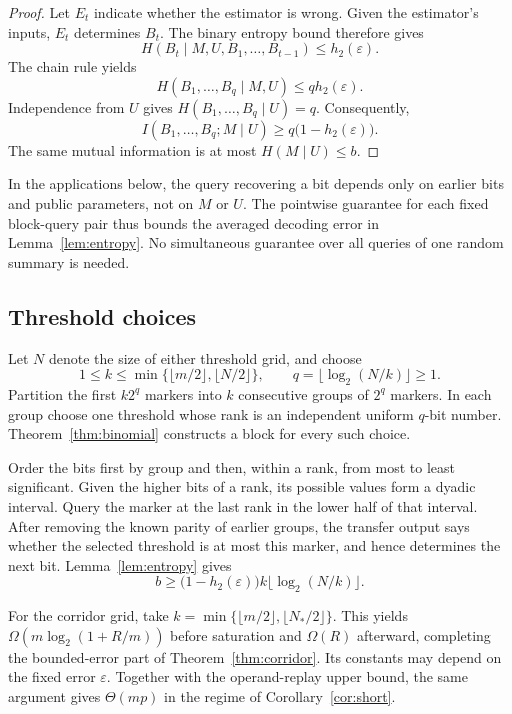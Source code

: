 \documentclass[11pt,reqno]{amsart}
\theoremstyle{definition}
\theoremstyle{remark}
\numberwithin{equation}{section}
\begin{document}
\begin{proof}
Let $E_t$ indicate whether the estimator is wrong. Given the
estimator's inputs, $E_t$ determines $B_t$. The binary entropy bound
therefore gives
\[
 H(B_t\mid M,U,B_1,\ldots,B_{t-1})\leq h_2(\varepsilon).
\]
The chain rule yields
\[
 H(B_1,\ldots,B_q\mid M,U)\leq qh_2(\varepsilon).
\]
Independence from $U$ gives $H(B_1,\ldots,B_q\mid U)=q$. Consequently,
\[
 I(B_1,\ldots,B_q;M\mid U)
 \geq q\bigl(1-h_2(\varepsilon)\bigr).
\]
The same mutual information is at most $H(M\mid U)\leq b$.
\end{proof}

In the applications below, the query recovering a bit depends only on
earlier bits and public parameters, not on $M$ or $U$. The pointwise
guarantee for each fixed block-query pair thus bounds the averaged
decoding error in Lemma~\ref{lem:entropy}. No simultaneous guarantee
over all queries of one random summary is needed.

\subsection{Threshold choices}
\label{subsec:random-thresholds}

Let $N$ denote the size of either threshold grid, and choose
\[
 1\leq k\leq\min\{\lfloor m/2\rfloor,\lfloor N/2\rfloor\},
 \qquad q=\lfloor\log_2(N/k)\rfloor\geq 1.
\]
Partition the first $k2^q$ markers into $k$ consecutive groups of
$2^q$ markers. In each group choose one threshold whose rank is an
independent uniform $q$-bit number. Theorem~\ref{thm:binomial}
constructs a block for every such choice.

Order the bits first by group and then, within a rank, from most to
least significant. Given the higher bits of a rank, its possible
values form a dyadic interval. Query the marker at the last rank in
the lower half of that interval. After removing the known parity
of earlier groups, the transfer output says whether the selected
threshold is at most this marker, and hence determines the next bit.
Lemma~\ref{lem:entropy} gives
\begin{equation}
\label{eq:random-threshold-bound}
 b\geq\bigl(1-h_2(\varepsilon)\bigr)
       k\lfloor\log_2(N/k)\rfloor.
\end{equation}

For the corridor grid, take
$k=\min\{\lfloor m/2\rfloor,\lfloor N_\ast/2\rfloor\}$.
This yields $\Omega(m\log_2(1+R/m))$ before saturation and
$\Omega(R)$ afterward, completing the bounded-error part of
Theorem~\ref{thm:corridor}. Its constants may depend on the fixed
error $\varepsilon$. Together with the operand-replay upper bound,
the same argument gives $\Theta(mp)$ in the regime of
Corollary~\ref{cor:short}.
\end{document}
